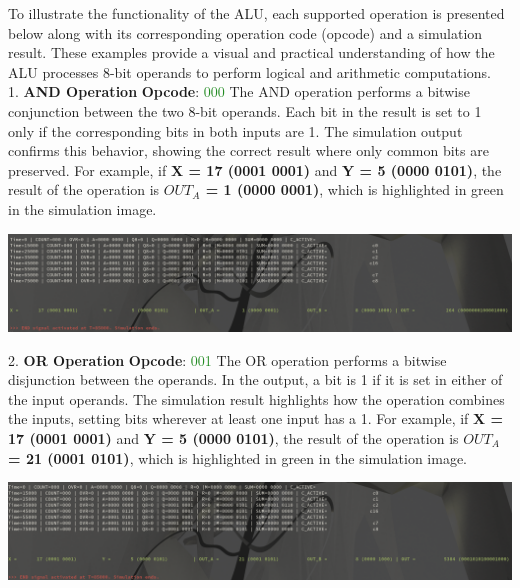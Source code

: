 \documentclass[12pt, letterpaper]{article}
\begin{document}

To illustrate the functionality of the ALU, each supported operation is presented below along with its corresponding operation code (opcode) and a simulation result. These examples provide a visual and practical understanding of how the ALU processes 8-bit operands to perform logical and arithmetic computations.\\

1. \textbf{AND Operation}
\textbf{Opcode}: \textcolor{ForestGreen}{000}
The AND operation performs a bitwise conjunction between the two 8-bit operands. Each bit in the result is set to 1 only if the corresponding bits in both inputs are 1. The simulation output confirms this behavior, showing the correct result where only common bits are preserved.
For example, if \textbf{X = 17 (0001 0001)} and \textbf{Y = 5 (0000 0101)}, the result of the operation is                   \textbf{$OUT_A$ = 1 (0000 0001)}, which is highlighted in green in the simulation image.

\begin{center}
\includegraphics[scale=0.3]{Documentation/AND}
\end{center}

2. \textbf{OR Operation}
\textbf{Opcode}: \textcolor{ForestGreen}{001}
The OR operation performs a bitwise disjunction between the operands. In the output, a bit is 1 if it is set in either of the input operands. The simulation result highlights how the operation combines the inputs, setting bits wherever at least one input has a 1.
For example, if \textbf{X = 17 (0001 0001)} and \textbf{Y = 5 (0000 0101)}, the result of the operation is \textbf{$OUT_A$ = 21 (0001 0101)}, which is highlighted in green in the simulation image.

\begin{center}
\includegraphics[scale=0.3]{Documentation/OR}
\end{center}
\end{document}
